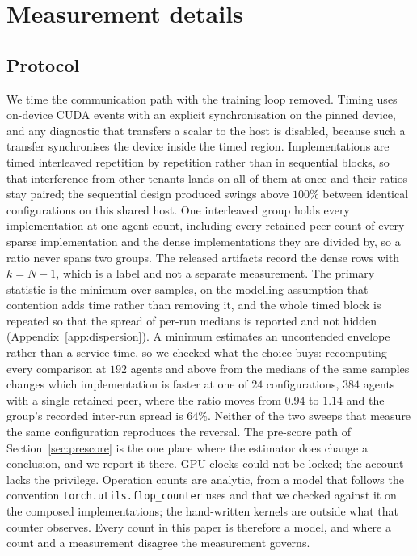 \section{Measurement details}
\label{app:measure}

\subsection{Protocol}
\label{sec:protocol}

We time the communication path with the training loop removed. Timing uses
on-device CUDA events with an explicit synchronisation on the pinned device, and
any diagnostic that transfers a scalar to the host is disabled, because such a
transfer synchronises the device inside the timed region. Implementations are
timed interleaved repetition by repetition rather than in
sequential blocks, so that interference from other tenants lands on all of
them at once and their ratios stay paired; the sequential design produced
swings above $100\%$ between identical configurations on this shared host. One
interleaved group holds every implementation at one agent count, including
every retained-peer count of every sparse implementation and the dense
implementations they are divided by, so a ratio never spans two groups. The
released artifacts record the dense rows with $k = N-1$, which is a label and
not a separate measurement. The primary statistic is the
minimum over samples, on the modelling assumption that contention adds time
rather than removing it, and the whole timed block is repeated so that the
spread of per-run medians is reported and not hidden
(Appendix~\ref{app:dispersion}). A minimum estimates an uncontended envelope
rather than a service time, so we checked what the choice buys: recomputing
every comparison at $192$ agents and above from the medians of the same
samples changes which implementation is faster at one of $24$ configurations,
$384$ agents with a single retained peer, where the ratio moves from $0.94$ to
$1.14$ and the group's recorded inter-run spread is $64\%$. Neither of the two
sweeps that measure the same configuration reproduces the reversal. The
pre-score path of Section~\ref{sec:prescore} is the one place where the
estimator does change a conclusion, and we report it there. GPU clocks could not be locked; the account
lacks the privilege. Operation counts are analytic, from a model that follows
the convention \texttt{torch.utils.flop\_counter} uses and that we checked
against it on the composed implementations; the hand-written kernels are outside
what that counter observes. Every count in this paper is therefore a model, and
where a count and a measurement disagree the measurement governs.

